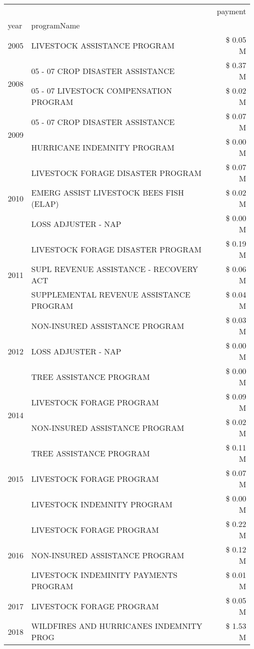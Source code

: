 \begin{tabular}{llr}
\toprule
 &  & payment \\
year & programName &  \\
\midrule
2005 & LIVESTOCK ASSISTANCE PROGRAM & \$ 0.05 M \\
\cline{1-3}
\multirow[t]{2}{*}{2008} & 05 - 07 CROP DISASTER ASSISTANCE & \$ 0.37 M \\
 & 05 - 07 LIVESTOCK COMPENSATION PROGRAM & \$ 0.02 M \\
\cline{1-3}
\multirow[t]{2}{*}{2009} & 05 - 07 CROP DISASTER ASSISTANCE & \$ 0.07 M \\
 & HURRICANE INDEMNITY PROGRAM & \$ 0.00 M \\
\cline{1-3}
\multirow[t]{3}{*}{2010} & LIVESTOCK FORAGE DISASTER PROGRAM & \$ 0.07 M \\
 & EMERG ASSIST LIVESTOCK BEES FISH (ELAP) & \$ 0.02 M \\
 & LOSS ADJUSTER - NAP & \$ 0.00 M \\
\cline{1-3}
\multirow[t]{3}{*}{2011} & LIVESTOCK FORAGE DISASTER PROGRAM & \$ 0.19 M \\
 & SUPL REVENUE ASSISTANCE - RECOVERY ACT & \$ 0.06 M \\
 & SUPPLEMENTAL REVENUE ASSISTANCE PROGRAM & \$ 0.04 M \\
\cline{1-3}
\multirow[t]{3}{*}{2012} & NON-INSURED ASSISTANCE PROGRAM & \$ 0.03 M \\
 & LOSS ADJUSTER - NAP & \$ 0.00 M \\
 & TREE ASSISTANCE PROGRAM & \$ 0.00 M \\
\cline{1-3}
\multirow[t]{2}{*}{2014} & LIVESTOCK FORAGE PROGRAM & \$ 0.09 M \\
 & NON-INSURED ASSISTANCE PROGRAM & \$ 0.02 M \\
\cline{1-3}
\multirow[t]{3}{*}{2015} & TREE ASSISTANCE PROGRAM & \$ 0.11 M \\
 & LIVESTOCK FORAGE PROGRAM & \$ 0.07 M \\
 & LIVESTOCK INDEMNITY PROGRAM & \$ 0.00 M \\
\cline{1-3}
\multirow[t]{3}{*}{2016} & LIVESTOCK FORAGE PROGRAM & \$ 0.22 M \\
 & NON-INSURED ASSISTANCE PROGRAM & \$ 0.12 M \\
 & LIVESTOCK INDEMINITY PAYMENTS PROGRAM & \$ 0.01 M \\
\cline{1-3}
2017 & LIVESTOCK FORAGE PROGRAM & \$ 0.05 M \\
\cline{1-3}
\multirow[t]{3}{*}{2018} & WILDFIRES AND HURRICANES INDEMNITY PROG & \$ 1.53 M \\

\end{tabular}
